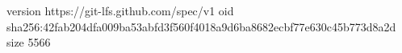 version https://git-lfs.github.com/spec/v1
oid sha256:42fab204dfa009ba53abfd3f560f4018a9d6ba8682ecbf77e630c45b773d8a2d
size 5566
